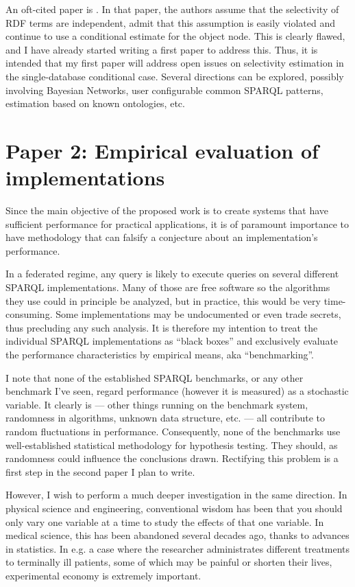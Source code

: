 \documentclass[a4paper,english,10pt]{article}
\begin{document}
An oft-cited paper is \cite{Stocker:2008:SBG:1367497.1367578}. In that
paper, the authors assume that the selectivity of RDF terms are
independent, admit that this assumption is easily violated and
continue to use a conditional estimate for the object node. This is
clearly flawed, and I have already started writing a first paper to
address this. Thus, it is intended that my first paper will address
open issues on selectivity estimation in the single-database
conditional case.  Several directions can be explored, possibly
involving Bayesian Networks, user configurable common SPARQL patterns,
estimation based on known ontologies, etc.

\section*{Paper 2: Empirical evaluation of implementations}

Since the main objective of the proposed work is to create systems
that have sufficient performance for practical applications, it is of
paramount importance to have methodology that can falsify a
conjecture about an implementation's performance.

In a federated regime, any query is likely to execute queries on
several different SPARQL implementations. Many of those are free
software so the algorithms they use could in principle be analyzed,
but in practice, this would be very time-consuming. Some
implementations may be undocumented or even trade secrets, thus
precluding any such analysis. It is therefore my intention to treat
the individual SPARQL implementations as ``black boxes'' and
exclusively evaluate the performance characteristics by empirical
means, aka ``benchmarking''.

I note that none of the established SPARQL benchmarks, or any other
benchmark I've seen, regard performance (however it is measured) as a
stochastic variable. It clearly is --- other things running on the
benchmark system, randomness in algorithms, unknown data structure,
etc. --- all contribute to random fluctuations in
performance. Consequently, none of the benchmarks use well-established
statistical methodology for hypothesis testing. They should, as
randomness could influence the conclusions drawn. Rectifying this
problem is a first step in the second paper I plan to write.

However, I wish to perform a much deeper investigation in the same
direction. In physical science and engineering, conventional wisdom
has been that you should only vary one variable at a time to study the
effects of that one variable. In medical science, this has been
abandoned several decades ago, thanks to advances in statistics. In
e.g. a case where the researcher administrates different treatments to
terminally ill patients, some of which may be painful or shorten their
lives, experimental economy is extremely important.
\end{document}
